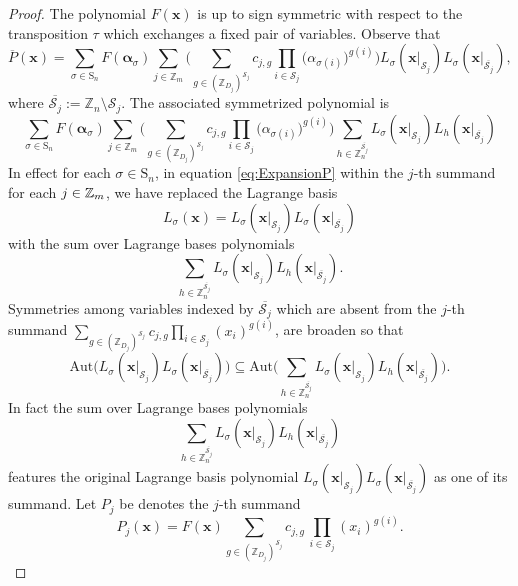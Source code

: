 \begin{proof}
The polynomial $F(\mathbf{x})$ is up to sign symmetric with respect to the transposition $\tau$ which exchanges a fixed pair of variables. Observe that
\begin{equation}\label{eq:ExpansionP}
\overline{P}(\mathbf{x})=\sum_{\sigma\in\text{S}_{n}}F(\boldsymbol{\alpha}_{\sigma})\sum_{j\in\mathbb{Z}_{m}}\bigg(\sum_{g\in(\mathbb{Z}_{D_{j}})^{\mathscr{S}_{j}}}c_{j,g}\prod_{i\in\mathscr{S}_{j}}\big(\alpha_{\sigma(i)}\big)^{g(i)}\bigg)L_{\sigma}(\mathbf{x}|_{\mathscr{S}_{j}})L_{\sigma}(\mathbf{x}|_{\overline{\mathscr{S}_{j}}}),
\end{equation}
where $\overline{\mathscr{S}_{j}}:=\mathbb{Z}_n\setminus \mathscr{S}_{j}$. The associated symmetrized polynomial is
\[
\sum_{\sigma\in\text{S}_{n}}F(\boldsymbol{\alpha}_{\sigma})\sum_{j\in\mathbb{Z}_{m}}\bigg(\sum_{g\in(\mathbb{Z}_{D_{j}})^{\mathscr{S}_{j}}}c_{j,g}\prod_{i\in\mathscr{S}_{j}}\big(\alpha_{\sigma(i)}\big)^{g(i)}\bigg)\sum_{h\in\mathbb{Z}_{n}^{\overline{\mathscr{S}_{j}}}}L_{\sigma}(\mathbf{x}|_{\mathscr{S}_{j}})L_{h}(\mathbf{x}|_{\overline{\mathscr{S}_{j}}})
\]
In effect for each $\sigma\in\text{S}_{n}$, in equation \eqref{eq:ExpansionP} within the $j$-th summand for each $j\in {\mathbb Z}_m$, we have replaced the Lagrange basis
\[
L_{\sigma}(\mathbf{x})=L_{\sigma}(\mathbf{x}|_{\mathscr{S}_{j}})L_{\sigma}(\mathbf{x}|_{\overline{\mathscr{S}_{j}}})
\]
with the sum over Lagrange bases polynomials
\[
\sum_{h\in\mathbb{Z}_{n}^{\overline{\mathscr{S}_{j}}}}L_{\sigma}(\mathbf{x}|_{\mathscr{S}_{j}})L_{h}(\mathbf{x}|_{\overline{\mathscr{S}_{j}}}).
\]
Symmetries among variables indexed by $\overline{\mathscr{S}_{j}}$ which are absent from the $j$-th summand $\underset{g\in(\mathbb{Z}_{D_{j}})^{\mathscr{S}_{j}}}{\sum}c_{j,g}\underset{i\in\mathscr{S}_{j}}{\prod}(x_{i})^{g(i)}$,
are broaden so that
\[
\textrm{Aut}\bigg(L_{\sigma}(\mathbf{x}|_{\mathscr{S}_{j}})L_{\sigma}(\mathbf{x}|_{\overline{\mathscr{S}_{j}}})\bigg)\subseteq\textrm{Aut}\bigg(\sum_{h\in\mathbb{Z}_{n}^{\overline{\mathscr{S}_{j}}}}L_{\sigma}(\mathbf{x}|_{\mathscr{S}_{j}})L_{h}(\mathbf{x}|_{\overline{\mathscr{S}_{j}}})\bigg).
\]
In fact the sum over Lagrange bases polynomials
\[
\sum_{h\in\mathbb{Z}_{n}^{\overline{\mathscr{S}_{j}}}}L_{\sigma}(\mathbf{x}|_{\mathscr{S}_{j}})L_{h}(\mathbf{x}|_{\overline{\mathscr{S}_{j}}})
\]
 features the original Lagrange basis polynomial $L_{\sigma}(\mathbf{x}|_{\mathscr{S}_{j}})L_{\sigma}(\mathbf{x}|_{\overline{\mathscr{S}_{j}}})$ as one of its summand.
 Let $P_{j}$ be denotes the $j$-th summand
 \[
 P_{j}(\mathbf{x})=F(\mathbf{x})\sum_{g\in(\mathbb{Z}_{D_{j}})^{\mathscr{S}_{j}}}c_{j,g}\,\prod_{i\in\mathscr{S}_{j}}(x_{i})^{g(i)}.
\]
\end{proof}
